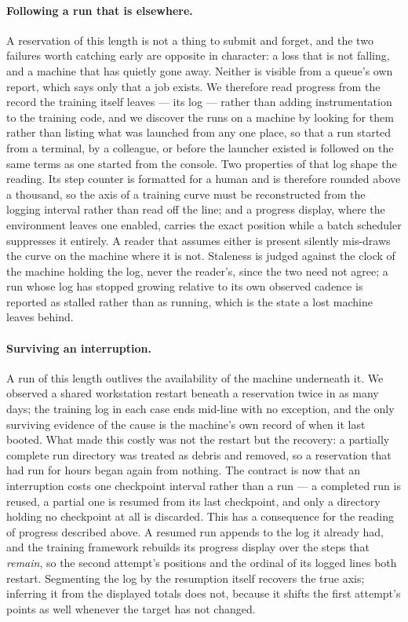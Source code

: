 \paragraph{Following a run that is elsewhere.} A reservation of this length
is not a thing to submit and forget, and the two failures worth catching early
are opposite in character: a loss that is not falling, and a machine that has
quietly gone away. Neither is visible from a queue's own report, which says
only that a job exists. We therefore read progress from the record the training
itself leaves --- its log --- rather than adding instrumentation to the training
code, and we discover the runs on a machine by looking for them rather than
listing what was launched from any one place, so that a run started from a
terminal, by a colleague, or before the launcher existed is followed on the same
terms as one started from the console. Two properties of that log shape the
reading. Its step counter is formatted for a human and is therefore rounded
above a thousand, so the axis of a training curve must be reconstructed from the
logging interval rather than read off the line; and a progress display, where
the environment leaves one enabled, carries the exact position while a batch
scheduler suppresses it entirely. A reader that assumes either is present
silently mis-draws the curve on the machine where it is not. Staleness is judged
against the clock of the machine holding the log, never the reader's, since the
two need not agree; a run whose log has stopped growing relative to its own
observed cadence is reported as stalled rather than as running, which is the
state a lost machine leaves behind.

\paragraph{Surviving an interruption.} A run of this length outlives the
availability of the machine underneath it. We observed a shared workstation
restart beneath a reservation twice in as many days; the training log in each
case ends mid-line with no exception, and the only surviving evidence of the
cause is the machine's own record of when it last booted. What made this costly
was not the restart but the recovery: a partially complete run directory was
treated as debris and removed, so a reservation that had run for hours began
again from nothing. The contract is now that an interruption costs one
checkpoint interval rather than a run --- a completed run is reused, a partial
one is resumed from its last checkpoint, and only a directory holding no
checkpoint at all is discarded. This has a consequence for the reading of
progress described above. A resumed run appends to the log it already had, and
the training framework rebuilds its progress display over the steps that
\emph{remain}, so the second attempt's positions and the ordinal of its logged
lines both restart. Segmenting the log by the resumption itself recovers the
true axis; inferring it from the displayed totals does not, because it shifts
the first attempt's points as well whenever the target has not changed.

